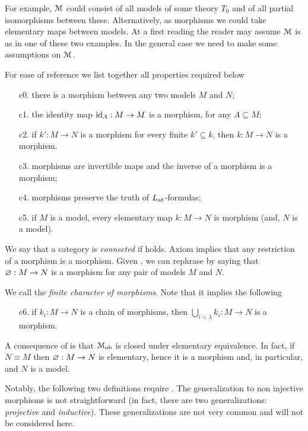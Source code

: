 \documentclass[creche.tex]{subfiles}
\begin{document}
For example, $\EuScript M$ could consist of all models of some theory $T_0$ and of all partial isomorphisms between these. Alternatively, as morphisms we could take elementary maps between models. At a first reading the reader may assume $\EuScript M$ is as in one of these two examples. In the general case we need to make some assumptions on $\EuScript M$.

\begin{definition}\label{def_com_c}For ease of reference we list together all properties required below
\begin{itemize} 
\item[c0.] there is a morphism between any two models $M$ and $N$;
\item[c1.] the identity map $\textrm{id}_A:M\to M$ is a morphism, for any $A\subseteq M$;
\item[c2.] if $k':M\to N$ is a morphism for every finite $k'\subseteq k$, then $k:M\to N$ is a morphism.
\item[c3.] morphisms are invertible maps and the inverse of a morphism is a morphism;
\item[c4.] morphisms preserve the truth of $L_{\tiny\rm at}\hskip-.3ex$\,-formulas;
\item[c5.] if $M$ is a model, every elementary map $k:M\to N$ is morphism (and, $N$ is a model).\QED
\end{itemize}
\end{definition}
 
We say that a category is \emph{connected\/} if  holds. Axiom  implies that any restriction of a morphism is a morphism. Given , we can rephrase  by saying that $\varnothing:M\to N$ is a morphism for any pair of models $M$ and $N$.

We call  the \emph{finite character of morphisms}. Note that it implies the following

\begin{itemize} 
\item[c6.] if $k_i:M\to N$ is a chain of morphisms, then $\displaystyle\bigcup_{i<\lambda} k_i:M\to N$ is a morphism.
\end{itemize}


A consequence of  is that $\EuScript M_{\rm ob}$ is closed under elementary equivalence. In fact, if $N\equiv M$ then $\varnothing:M\to N$ is elementary, hence it is a morphism and, in particular, and $N$ is a model.

Notably, the following two definitions require . The generalization to non injective morphisms is not straightforward (in fact, there are two generalizations: \textit{projective\/} and \textit{inductive\/}). These generalizations are not very common and will not be considered here. 
\end{document}
